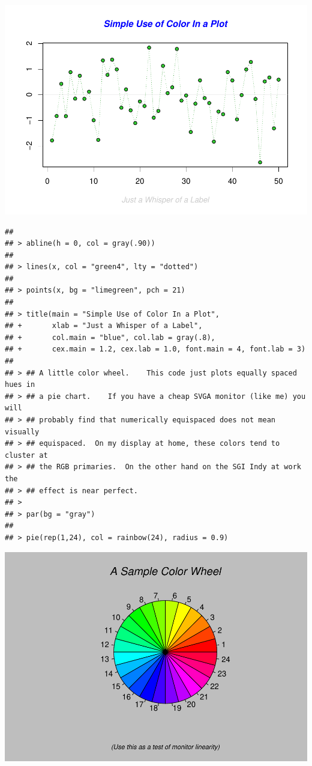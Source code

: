 \documentclass[
]{book}
\begin{document}
\includegraphics{bookdown-demo_files/figure-latex/unnamed-chunk-5-1.pdf}

\begin{verbatim}
## 
## > abline(h = 0, col = gray(.90))
## 
## > lines(x, col = "green4", lty = "dotted")
## 
## > points(x, bg = "limegreen", pch = 21)
## 
## > title(main = "Simple Use of Color In a Plot",
## +       xlab = "Just a Whisper of a Label",
## +       col.main = "blue", col.lab = gray(.8),
## +       cex.main = 1.2, cex.lab = 1.0, font.main = 4, font.lab = 3)
## 
## > ## A little color wheel.    This code just plots equally spaced hues in
## > ## a pie chart.    If you have a cheap SVGA monitor (like me) you will
## > ## probably find that numerically equispaced does not mean visually
## > ## equispaced.  On my display at home, these colors tend to cluster at
## > ## the RGB primaries.  On the other hand on the SGI Indy at work the
## > ## effect is near perfect.
## > 
## > par(bg = "gray")
## 
## > pie(rep(1,24), col = rainbow(24), radius = 0.9)
\end{verbatim}

\includegraphics{bookdown-demo_files/figure-latex/unnamed-chunk-5-2.pdf}
\end{document}
